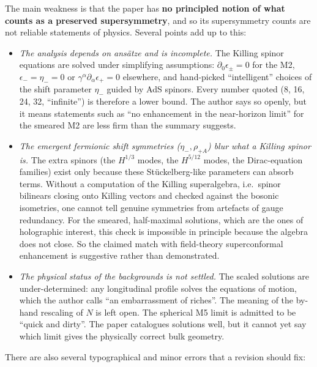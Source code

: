 \documentclass[11pt]{article}
\begin{document}
The main weakness is that the paper has \textbf{no principled notion of what counts as a
preserved supersymmetry}, and so its supersymmetry counts are not reliable statements of
physics. Several points add up to this:
\begin{itemize}
  \item \emph{The analysis depends on ansätze and is incomplete.} The Killing spinor equations
  are solved under simplifying assumptions: $\partial_0\epsilon_\pm=0$ for the M2,
  $\epsilon_-=\eta_-=0$ or $\gamma^\alpha\partial_\alpha\epsilon_+=0$ elsewhere, and
  hand-picked ``intelligent'' choices of the shift parameter $\eta_-$ guided by AdS
  spinors. Every number quoted (8, 16, 24, 32, ``infinite'') is therefore a lower
  bound. The author says so openly, but it means statements such as ``no enhancement in the
  near-horizon limit'' for the smeared M2 are less firm than the summary suggests.
  \item \emph{The emergent fermionic shift symmetries ($\eta_-,\rho_{+A}$) blur what a Killing
  spinor is.} The extra spinors (the $H^{1/3}$ modes, the $H^{5/12}$ modes, the Dirac-equation
  families) exist only because these Stückelberg-like parameters can absorb terms. Without a
  computation of the Killing superalgebra, i.e.\ spinor bilinears closing onto Killing vectors
  and checked against the bosonic isometries, one cannot tell genuine symmetries from
  artefacts of gauge redundancy. For the smeared, half-maximal solutions, which are the ones
  of holographic interest, this check is impossible in principle because the algebra does not
  close. So the claimed match with field-theory superconformal enhancement is suggestive
  rather than demonstrated.
  \item \emph{The physical status of the backgrounds is not settled.} The scaled solutions are
  under-determined: any longitudinal profile solves the equations of motion, which the author
  calls ``an embarrassment of riches''. The meaning of the by-hand rescaling of $N$ is left
  open. The spherical M5 limit is admitted to be ``quick and dirty''. The paper catalogues
  solutions well, but it cannot yet say which limit gives the physically correct bulk geometry.
\end{itemize}
There are also several typographical and minor errors that a revision should fix:
\end{document}
